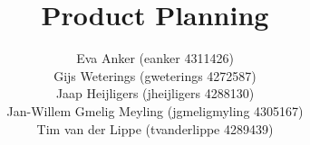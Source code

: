 \documentclass{tudelft-report}
\begin{document}
\frontmatter

\title[For MoodCat]{Product Planning}
\author{\small Eva Anker (eanker 4311426)\\
		Gijs Weterings (gweterings 4272587)\\
		Jaap Heijligers (jheijligers 4288130)\\
		Jan-Willem Gmelig Meyling (jgmeligmyling 4305167)\\
		Tim van der Lippe (tvanderlippe 4289439)}
\makecover



\tableofcontents




\mainmatter



\appendix

%

\printglossary

\end{document}
